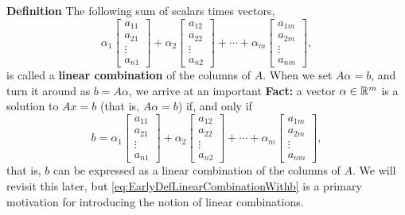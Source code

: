 \begin{tcolorbox}[sharp corners, colback=green!30, colframe=green!80!blue,title=\textbf{Linear Combination of the Columns of A}]

\textbf{Definition} The following sum of scalars times vectors,
\begin{equation}
    \label{eq:EarlyDefLinearCombination}
    \alpha_1 \begin{bmatrix} a_{11} \\ a_{21}\\ \vdots \\ a_{n1} \end{bmatrix}  + \alpha_2  \begin{bmatrix} a_{12} \\ a_{22}\\ \vdots \\ a_{n2} \end{bmatrix}  + \cdots + \alpha_m \begin{bmatrix} a_{1m} \\ a_{2m}\\ \vdots \\ a_{nm} \end{bmatrix},
\end{equation}
is called a \textbf{linear combination} of the columns of $A$. When we set $A\alpha = b$, and turn it around as $b =A \alpha$, we arrive at an important \textbf{Fact:} a vector $\alpha \in \mathbb R^m$ is a solution to $Ax=b$ (that is, $A \alpha = b$) if, and only if
\begin{equation}
    \label{eq:EarlyDefLinearCombinationWithb}
   b= \alpha_1 \begin{bmatrix} a_{11} \\ a_{21}\\ \vdots \\ a_{n1} \end{bmatrix}  + \alpha_2  \begin{bmatrix} a_{12} \\ a_{22}\\ \vdots \\ a_{n2} \end{bmatrix}  + \cdots + \alpha_m \begin{bmatrix} a_{1m} \\ a_{2m}\\ \vdots \\ a_{nm} \end{bmatrix},
\end{equation}
that is, $b$ can be expressed as a linear combination of the columns of $A$.
We will revisit this later, but \eqref{eq:EarlyDefLinearCombinationWithb} is a primary motivation for introducing the notion of linear combinations.
\end{tcolorbox}

